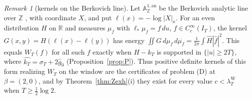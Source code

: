 \documentclass[11pt]{amsart}
\theoremstyle{definition}
\theoremstyle{remark}
\newtheorem{remark}[theorem]{Remark}
\newcommand{\R}{\mathbb R}
\newcommand{\Z}{\mathbb Z}
\newcommand{\IT}{I_T}
\newcommand{\lamW}{\lambda^{\mathrm W}_T}
\newcommand{\sT}{\sigma_T}
\newcommand{\gh}[1]{\widehat g_{#1}}
\begin{document}
\begin{remark}[kernels on the Berkovich line]\label{rem:normline}
Let $\mathbb A^{1,\mathrm{an}}_\Z$ be the Berkovich analytic line over $\Z$ \cite{Poineau2010}, with
coordinate $X$, and put $\ell(x)=-\log|X|_x$. For an even distribution $H$ on $\R$ and measures $\mu_f$
with $\ell_*\mu_f=f\,du$, $f\in C_c^\infty(\IT)$, the kernel $G(x,y)=H(\ell(x)-\ell(y))$ has energy
$\iint G\,d\mu_f\,d\overline{\mu_f}=\frac1{2\pi}\int\widehat H|\widehat f|^2$. This equals $W_T(f)$ for
all such $f$ exactly when $H-k_T$ is supported in $\{|u|\ge2T\}$, where $\widehat{k_T}=\sT+2\gh0$
(Proposition~\ref{prop:P}). Thus positive definite kernels of this form realizing $W_T$ on the window
are the certificates of problem (D) at $\beta=(2,0)$, and by Theorem~\ref{thm:Zexh}(i) they exist for
every value $c<\lamW$ when $T\ge\frac12\log2$.
\end{remark}
\end{document}
